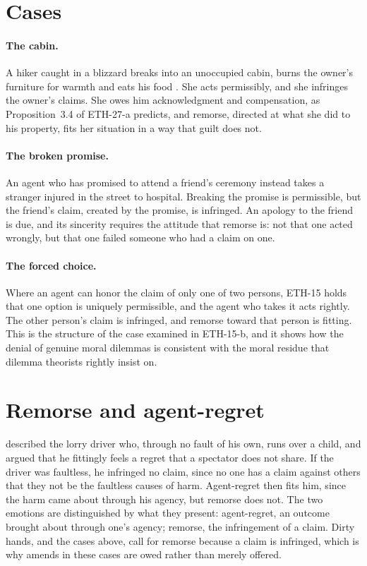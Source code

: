 \documentclass{situationist-preprint}
\begin{document}
\section{Cases}

\paragraph{The cabin.} A hiker caught in a blizzard breaks into an unoccupied cabin, burns the owner's furniture for warmth and eats his food \citep{Feinberg1978}. She acts permissibly, and she infringes the owner's claims. She owes him acknowledgment and compensation, as Proposition~3.4 of ETH-27-a predicts, and remorse, directed at what she did to his property, fits her situation in a way that guilt does not.

\paragraph{The broken promise.} An agent who has promised to attend a friend's ceremony instead takes a stranger injured in the street to hospital. Breaking the promise is permissible, but the friend's claim, created by the promise, is infringed. An apology to the friend is due, and its sincerity requires the attitude that remorse is: not that one acted wrongly, but that one failed someone who had a claim on one.

\paragraph{The forced choice.} Where an agent can honor the claim of only one of two persons, ETH-15 holds that one option is uniquely permissible, and the agent who takes it acts rightly. The other person's claim is infringed, and remorse toward that person is fitting. This is the structure of the case examined in ETH-15-b, and it shows how the denial of genuine moral dilemmas is consistent with the moral residue that dilemma theorists rightly insist on.

\section{Remorse and agent-regret}

\citet{Williams1976} described the lorry driver who, through no fault of his own, runs over a child, and argued that he fittingly feels a regret that a spectator does not share. If the driver was faultless, he infringed no claim, since no one has a claim against others that they not be the faultless causes of harm. Agent-regret then fits him, since the harm came about through his agency, but remorse does not. The two emotions are distinguished by what they present: agent-regret, an outcome brought about through one's agency; remorse, the infringement of a claim. Dirty hands, and the cases above, call for remorse because a claim is infringed, which is why amends in these cases are owed rather than merely offered.
\end{document}
